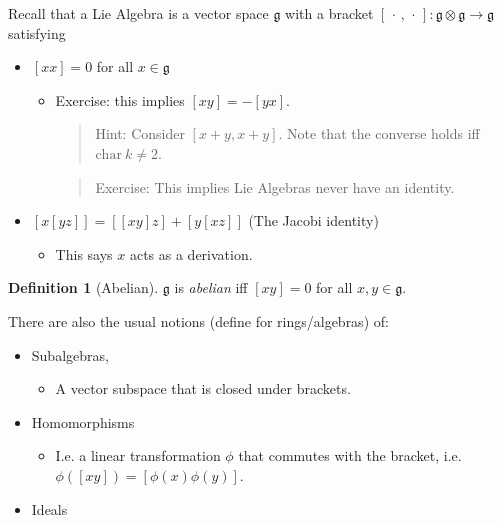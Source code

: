 \documentclass[11pt]{scrartcl}
\theoremstyle{definition}
\theoremstyle{theorem}
\theoremstyle{proof}
\theoremstyle{definition}
\newtheorem{definition}{Definition}[theorem]
\theoremstyle{break}
\theoremstyle{problem}
\providecommand{\tightlist}{%
  \setlength{\itemsep}{0pt}\setlength{\parskip}{0pt}}
\newcommand{\ch}[0]{\mathrm{char}~}
\newcommand{\lieg}[0]{{\mathfrak{g}}}
\newcommand{\tensor}[0]{\otimes}
\newcommand{\wait}[0]{{\,\cdot\,}}
\renewcommand{\to}[0]{\longrightarrow}
\begin{document}
Recall that a Lie Algebra is a vector space \(\lieg\) with a bracket
\([\wait, \wait]: \lieg\tensor \lieg \to \lieg\) satisfying

\begin{itemize}
\tightlist
\item
  \([x x] = 0\) for all \(x\in \lieg\)

  \begin{itemize}
  \item
    Exercise: this implies \([x y] = -[y x]\).

    \begin{quote}
    Hint: Consider \([x+y, x+y]\). Note that the converse holds iff
    \(\ch k \neq 2\).
    \end{quote}

    \begin{quote}
    Exercise: This implies Lie Algebras never have an identity.
    \end{quote}
  \end{itemize}
\item
  \([x [y z]] = [[x y] z] + [y [x z]]\) (The Jacobi identity)

  \begin{itemize}
  \tightlist
  \item
    This says \(x\) acts as a derivation.
  \end{itemize}
\end{itemize}

\begin{definition}[Abelian]

\(\lieg\) is \emph{abelian} iff \([x y] = 0\) for all
\(x,y\in\lieg\).\end{definition}

There are also the usual notions (define for rings/algebras) of:

\begin{itemize}
\tightlist
\item
  Subalgebras,

  \begin{itemize}
  \tightlist
  \item
    A vector subspace that is closed under brackets.
  \end{itemize}
\item
  Homomorphisms

  \begin{itemize}
  \tightlist
  \item
    I.e. a linear transformation \(\phi\) that commutes with the
    bracket, i.e.~\(\phi([x y]) = [\phi(x) \phi(y)]\).
  \end{itemize}
\item
  Ideals
\end{itemize}
\end{document}

